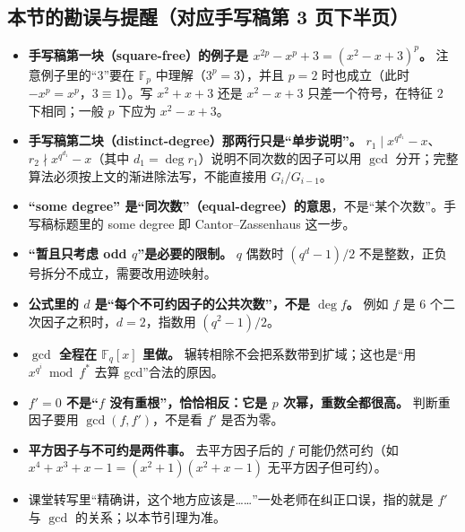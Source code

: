 \subsection{本节的勘误与提醒（对应手写稿第 3 页下半页）}


\begin{itemize}
\item \textbf{手写稿第一块（square-free）的例子是 $x^{2p}-x^p+3=(x^2-x+3)^p$。} 注意例子里的“$3$”要在 $\mathbb F_p$ 中理解（$3^p=3$），并且 $p=2$ 时也成立（此时 $-x^p=x^p$，$3\equiv1$）。写 $x^2+x+3$ 还是 $x^2-x+3$ 只差一个符号，在特征 $2$ 下相同；一般 $p$ 下应为 $x^2-x+3$。
\item \textbf{手写稿第二块（distinct-degree）那两行只是“单步说明”。} $r_1\mid x^{q^{d_1}}-x$、$r_2\nmid x^{q^{d_1}}-x$（其中 $d_1=\deg r_1$）说明不同次数的因子可以用 $\gcd$ 分开；完整算法必须按上文的渐进除法写，不能直接用 $G_i/G_{i-1}$。
\item \textbf{“some degree” 是“同次数”（equal-degree）的意思}，不是“某个次数”。手写稿标题里的 some degree 即 Cantor–Zassenhaus 这一步。
\item \textbf{“暂且只考虑 odd $q$”是必要的限制。} $q$ 偶数时 $(q^d-1)/2$ 不是整数，正负号拆分不成立，需要改用迹映射。
\item \textbf{公式里的 $d$ 是“每个不可约因子的公共次数”，不是 $\deg f$。} 例如 $f$ 是 6 个二次因子之积时，$d=2$，指数用 $(q^2-1)/2$。
\item \textbf{$\gcd$ 全程在 $\mathbb F_q[x]$ 里做。} 辗转相除不会把系数带到扩域；这也是“用 $x^{q^i}\bmod f^\ast$ 去算 gcd”合法的原因。
\item \textbf{$f'=0$ 不是“$f$ 没有重根”，恰恰相反：它是 $p$ 次幂，重数全都很高。} 判断重因子要用 $\gcd(f,f')$，不是看 $f'$ 是否为零。
\item \textbf{平方因子与不可约是两件事。} 去平方因子后的 $f$ 可能仍然可约（如 $x^4+x^3+x-1=(x^2+1)(x^2+x-1)$ 无平方因子但可约）。
\item 课堂转写里“精确讲，这个地方应该是……”一处老师在纠正口误，指的就是 $f'$ 与 $\gcd$ 的关系；以本节引理为准。
\end{itemize}
